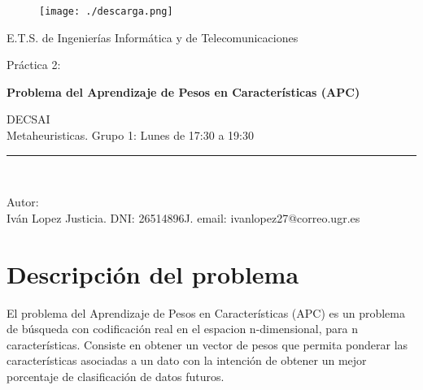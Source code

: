 \documentclass[14pt]{article}
\begin{document}
\begin{titlepage}

\begin{center}
	\vspace*{-1in}
	\begin{figure}[htb]
		\begin{center}
			\texttt{[image: ./descarga.png]}
		\end{center}
	\end{figure}
	
E.T.S. de Ingenierías Informática y de Telecomunicaciones\\
\vspace*{0.4in}
\begin{large}
Práctica 2:\\
\end{large}
\vspace*{0.2in}
\begin{huge}
\textbf{Problema del Aprendizaje de Pesos en Características (APC)}\\
\end{huge}
\vspace*{0.9in}
\begin{large}
DECSAI\\
\vspace*{0.1in}
Metaheuristicas. Grupo 1: Lunes de 17:30 a 19:30\\
\end{large}
\vspace*{0.3in}
\rule{80mm}{0.1mm}\\
\vspace*{0.1in}
\begin{large}
Autor:\\
Iván Lopez Justicia. DNI: 26514896J. 
email: ivanlopez27@correo.ugr.es
\end{large}
\end{center}
\end{titlepage}

\date{}

\newpage 

\tableofcontents
\vfill

\newpage
%
\section{Descripción del problema}
El problema del Aprendizaje de Pesos en Características (APC) es un problema de búsqueda con codificación real en el espacion n-dimensional, para n características. Consiste en obtener un vector de pesos que permita ponderar las características asociadas a un dato con la intención de obtener un mejor porcentaje de clasificación de datos futuros. \\
\end{document}

